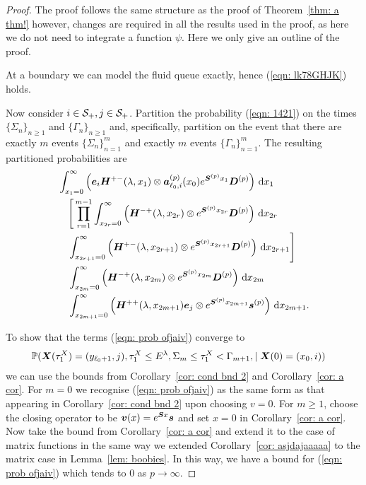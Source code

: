 \begin{proof}
	The proof follows the same structure as the proof of Theorem~\ref{thm: a thm!} however, changes are required in all the results used in the proof, as here we do not need to integrate a function \(\psi\). Here we only give an outline of the proof. 

	At a boundary we can model the fluid queue exactly, hence (\ref{eqn: lk78GHJK}) holds.

	Now consider \(i\in \mathcal{S}_+,j\in\mathcal{S}_+\). Partition the probability (\ref{eqn: 1421}) on the times \(\{\Sigma_n\}_{n\geq 1}\) and \(\{\Gamma_n\}_{n\geq 1}\) and, specifically, partition on the event that there are exactly \(m\) events \(\{\Sigma_n\}_{n=1}^m\) and exactly \(m\) events \(\{\Gamma_n\}_{n=1}^m\). 
	The resulting partitioned probabilities are
	\begin{align}
                 &\int_{x_1=0}^\infty \left(\boldsymbol e_i\boldsymbol H^{+-}(\lambda,x_1)\otimes \boldsymbol a_{\ell_0,i}^{(p)}(x_0)e^{\boldsymbol{S}^{(p)}x_1}\boldsymbol{D}^{(p)}\right)\, \mathrm{d} x_1 \nonumber
            	\\&\nonumber \quad \Bigg[\prod_{r=1}^{m-1} \int_{x_{2r}=0}^\infty \left(\boldsymbol H^{-+}(\lambda,x_{2r}) \otimes e^{\boldsymbol{S}^{(p)}x_{2r}}\boldsymbol D^{(p)}\right)\, \mathrm{d} x_{2r} \\&\quad \int_{x_{2r+1}=0}^\infty \left(\boldsymbol H^{+-}(\lambda,x_{2r+1}) \otimes e^{\boldsymbol{S}^{(p)}x_{2r+1}}\boldsymbol D^{(p)}\right) \, \mathrm{d} x_{2r+1}\Bigg] \nonumber
            	\\&
            	\quad \int_{x_{2m}=0}^\infty \left(\boldsymbol H^{-+}(\lambda, x_{2m}) \otimes e^{\boldsymbol{S}^{(p)}x_{2m}}\boldsymbol{D}^{(p)}\right) \, \mathrm{d} x_{2m} \nonumber
				\\&\quad \int_{x_{2m+1}=0}^\infty \left( \boldsymbol H^{++}(\lambda,x_{2m+1})\boldsymbol e_j \otimes  e^{\boldsymbol{S}^{(p)}x_{2m+1}}\boldsymbol s^{(p)} \right) \, \mathrm{d} x_{2m+1}.  \label{eqn: prob ofjaiv}
	\end{align}

	To show that the terms (\ref{eqn: prob ofjaiv}) converge to 
	\begin{align}
		&\mathbb P(\boldsymbol X(\tau_1^X)=(y_{\ell_0+1},j),\tau_1^X\leq E^\lambda, \Sigma_{m}\leq \tau_1^X<\Gamma_{m+1}, \mid \boldsymbol X(0)=(x_0, i))
	\end{align}
	we can use the bounds from Corollary~\ref{cor: cond bnd 2} and Corollary~\ref{cor: a cor}. For \(m=0\) we recognise (\ref{eqn: prob ofjaiv}) as the same form as that appearing in Corollary~\ref{cor: cond bnd 2} upon choosing \(v=0\). For \(m\geq 1\), choose the closing operator to be \(\boldsymbol v(x)=e^{\boldsymbol S x}\boldsymbol s\) and set \(x=0\) in Corollary~\ref{cor: a cor}. Now take the bound from Corollary~\ref{cor: a cor} and extend it to the case of matrix functions in the same way we extended Corollary~\ref{cor: asjdajaaaaa} to the matrix case in Lemma~\ref{lem: boobies}. In this way, we have a bound for (\ref{eqn: prob ofjaiv}) which tends to \(0\) as \(p\to\infty\).


\end{proof}
